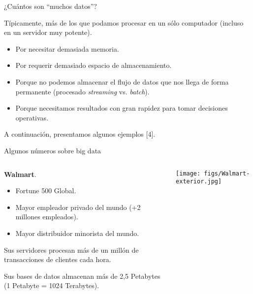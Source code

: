 
\begin{frame}{¿Cuántos son ``muchos datos''?}
\begin{wideitemize}
 \item Típicamente, más de los que podamos procesar en un sólo computador
 (incluso en un servidor muy potente).
 \begin{itemize}
  \item Por necesitar demasiada memoria.
  \item Por requerir demasiado espacio de almacenamiento.
  \item Porque no podemos almacenar el flujo de datos que nos llega de forma
  permanente (procesado \textit{streaming} vs. \textit{batch}).
  \item Porque necesitamos resultados con gran rapidez para tomar decisiones
  operativas.
 \end{itemize}
 
 \item A continuación, presentamos algunos ejemplos [4].

\end{wideitemize}
 
\end{frame}


\begin{frame}{Algunos números sobre big data}
 \begin{columns}[T]
    \begin{column}{.7\textwidth}
    \begin{wideitemize}
     \item \textbf{Walmart}.
     \begin{itemize}
      \item Fortune 500 Global.
      \item Mayor empleador privado del mundo (+2 millones empleados).
      \item Mayor distribuidor minorista del mundo.
     \end{itemize}

     \item Sus servidores procesan más de un millón de transacciones de clientes
     cada hora.
     \item Sus bases de datos almacenan más de 2,5 Petabytes (1 Petabyte = 1024 Terabytes).
     
    \end{wideitemize}

    \end{column}
    \begin{column}{.3\textwidth}
    \vspace*{1cm}
    \hspace*{-0.5cm}
    \texttt{[image: figs/Walmart-exterior.jpg]}
    \end{column}
  \end{columns}

\end{frame}

